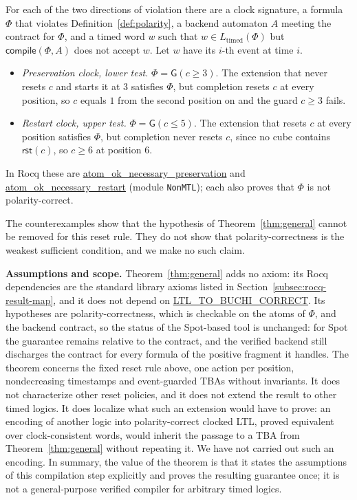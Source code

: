 \documentclass[manuscript]{acmart}
\newcommand{\Always}{\mathsf{G}}
\providecommand{\Reset}{}\renewcommand{\Reset}{\mathsf{rst}}
\newcommand{\runinhead}[1]{\par\noindent\textbf{#1}\enspace}
\newcommand{\Rocqid}[1]{\url{#1}}
\begin{document}
\begin{theorem}
\label{thm:polarity-necessary}
For each of the two directions of violation there are a clock signature, a
formula $\Phi$ that violates Definition~\ref{def:polarity}, a backend automaton
$A$ meeting the contract for $\Phi$, and a timed word $w$ such that
$w\in L_{\mathrm{timed}}(\Phi)$ but $\mathsf{compile}(\Phi,A)$ does not
accept $w$. Let $w$ have its $i$-th event at time $i$.
\begin{itemize}
\item \emph{Preservation clock, lower test.} $\Phi=\Always(c\ge 3)$. The
      extension that never resets $c$ and starts it at $3$ satisfies $\Phi$,
      but completion resets $c$ at every position, so $c$ equals $1$ from the
      second position on and the guard $c\ge 3$ fails.
\item \emph{Restart clock, upper test.} $\Phi=\Always(c\le 5)$. The extension
      that resets $c$ at every position satisfies $\Phi$, but completion never
      resets $c$, since no cube contains $\Reset(c)$, so $c\ge 6$ at position
      $6$.
\end{itemize}
In Rocq these are \Rocqid{atom_ok_necessary_preservation} and
\Rocqid{atom_ok_necessary_restart} (module \texttt{NonMTL}); each also proves
that $\Phi$ is not polarity-correct.
\end{theorem}

The counterexamples show that the hypothesis of Theorem~\ref{thm:general}
cannot be removed for this reset rule. They do not show that
polarity-correctness is the weakest sufficient condition, and we make no such
claim.

\runinhead{Assumptions and scope.}
Theorem~\ref{thm:general} adds no axiom: its Rocq dependencies are the standard
library axioms listed in Section~\ref{subsec:rocq-result-map}, and it does not
depend on \Rocqid{LTL_TO_BUCHI_CORRECT}. Its hypotheses are polarity-correctness,
which is checkable on the atoms of $\Phi$, and the backend contract, so the
status of the Spot-based tool is unchanged: for Spot the guarantee remains
relative to the contract, and the verified backend still discharges
the contract for every formula of the positive fragment it handles. The theorem concerns the fixed reset rule above,
one action per position, nondecreasing timestamps and event-guarded TBAs
without invariants. It does not characterize other reset policies, and it does
not extend the result to other timed logics. It does localize what such an
extension would have to prove: an encoding of another logic into
polarity-correct clocked LTL, proved equivalent over clock-consistent words,
would inherit the passage to a TBA from Theorem~\ref{thm:general} without
repeating it. We have not carried out such an encoding. In summary, the value of the
theorem is that it states the assumptions of this compilation step explicitly
and proves the resulting guarantee once; it is not a general-purpose verified
compiler for arbitrary timed logics.
\end{document}
